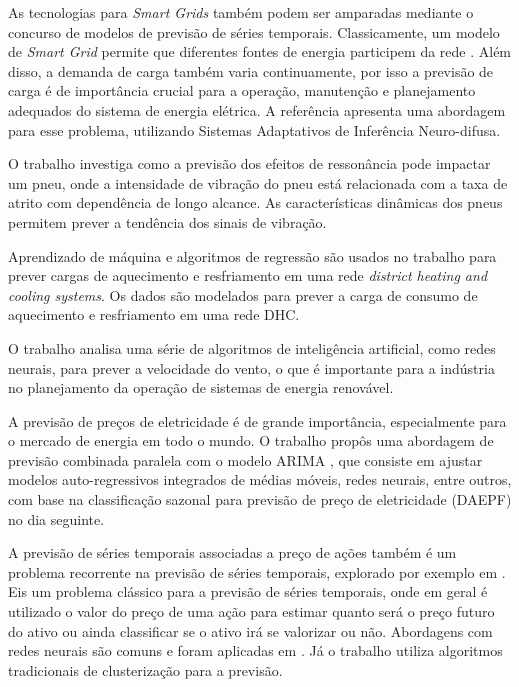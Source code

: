 As tecnologias para \textit{Smart Grids} também podem ser amparadas mediante o concurso de modelos de previsão de séries temporais. Classicamente, um modelo de \emph{Smart Grid} permite que diferentes fontes de energia participem da rede \cite{8408964}. Além disso, a demanda de carga também varia continuamente, por isso a previsão de carga é de importância crucial para a operação, manutenção e planejamento adequados do sistema de energia elétrica. A referência \cite{8408964} apresenta uma abordagem para esse problema, utilizando Sistemas Adaptativos de Inferência Neuro-difusa.

O trabalho \cite{8410563} investiga como a previsão dos efeitos de ressonância pode impactar um pneu, onde a intensidade de vibração do pneu está relacionada com a taxa de atrito com dependência de longo alcance. As características dinâmicas dos pneus permitem prever a tendência dos sinais de vibração.

Aprendizado de máquina e algoritmos de regressão são usados no trabalho \cite{8403331} para prever cargas de aquecimento e resfriamento em uma rede \textit{district heating and cooling systems}. Os dados são modelados para prever a carga de consumo de aquecimento e resfriamento em uma rede DHC.

O trabalho \cite{8408773} analisa uma série de algoritmos de inteligência artificial, como redes neurais, para prever a velocidade do vento, o que é importante para a indústria no planejamento da operação de sistemas de energia renovável.

A previsão de preços de eletricidade é de grande importância, especialmente para o mercado de energia em todo o mundo. O trabalho \cite{8403372} propôs uma abordagem de previsão combinada paralela com o modelo ARIMA \cite{box1970time}, que consiste em ajustar modelos auto-regressivos integrados de médias móveis, redes neurais, entre outros, com base na classificação sazonal para previsão de preço de eletricidade (DAEPF) no dia seguinte. 

A previsão de séries temporais associadas a preço de ações também é um problema recorrente na previsão de séries temporais, explorado por exemplo em \cite{8410278, 7310722}. Eis um problema clássico para a previsão de séries temporais, onde em geral é utilizado o valor do preço de uma ação para estimar quanto será o preço futuro do ativo ou ainda classificar se o ativo irá se valorizar ou não. Abordagens com redes neurais são comuns e foram aplicadas em \cite{8410278}. Já o trabalho \cite{7310722} utiliza algoritmos tradicionais de clusterização para a previsão.

